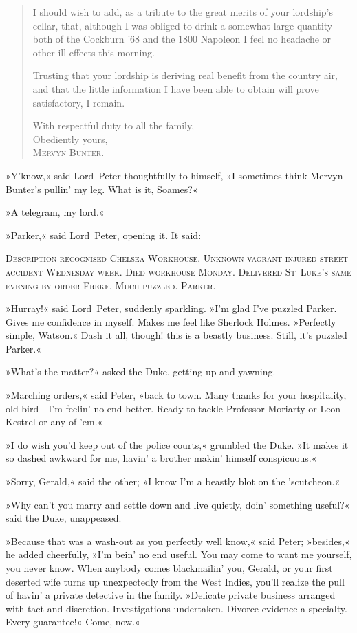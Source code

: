 \begin{quotation}
I should wish to add, as a tribute to the great merits of your lordship's cellar, that, although I was obliged to drink a somewhat large quantity both of the Cockburn '68 and the 1800 Napoleon I feel no headache or other ill effects this morning.

Trusting that your lordship is deriving real benefit from the country air, and that the little information I have been able to obtain will prove satisfactory, I remain.


\begin{flushright}
With respectful duty to all the family,\\
Obediently yours,\\
\textsc{Mervyn Bunter.}
\end{flushright}
\end{quotation}

»Y'know,« said Lord~Peter thoughtfully to himself, »I sometimes think Mervyn Bunter's pullin' my leg. What is it, Soames?«

»A telegram, my lord.«

»Parker,« said Lord~Peter, opening it. It said:

\textsc{Description recognised Chelsea Workhouse. Unknown vagrant injured street accident Wednesday week. Died workhouse Monday. Delivered St~Luke's same evening by order Freke. Much puzzled. Parker.}

»Hurray!« said Lord~Peter, suddenly sparkling. »I'm glad I've puzzled Parker. Gives me confidence in myself. Makes me feel like Sherlock Holmes. »Perfectly simple, Watson.« Dash it all, though! this is a beastly business. Still, it's puzzled Parker.«

»What's the matter?« asked the Duke, getting up and yawning.

»Marching orders,« said Peter, »back to town. Many thanks for your hospitality, old bird—I'm feelin' no end better. Ready to tackle Professor Moriarty or Leon Kestrel or any of 'em.«

»I do wish you'd keep out of the police courts,« grumbled the Duke. »It makes it so dashed awkward for me, havin' a brother makin' himself conspicuous.«

»Sorry, Gerald,« said the other; »I know I'm a beastly blot on the 'scutcheon.«

»Why can't you marry and settle down and live quietly, doin' something useful?« said the Duke, unappeased.

»Because that was a wash-out as you perfectly well know,« said Peter; »besides,« he added cheerfully, »I'm bein' no end useful. You may come to want me yourself, you never know. When anybody comes blackmailin' you, Gerald, or your first deserted wife turns up unexpectedly from the West Indies, you'll realize the pull of havin' a private detective in the family. »Delicate private business arranged with tact and discretion. Investigations undertaken. Divorce evidence a specialty. Every guarantee!« Come, now.«

